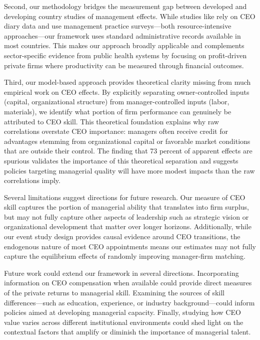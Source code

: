 \documentclass[11pt,a4paper]{article}
\begin{document}
Second, our methodology bridges the measurement gap between developed and developing country studies of management effects. While studies like \citet{bandiera2020ceo} rely on CEO diary data and \citet{bloom2013does} use management practice surveys---both resource-intensive approaches---our framework uses standard administrative records available in most countries. This makes our approach broadly applicable and complements sector-specific evidence from public health systems \citep{janke2024role, munoz2024leadership} by focusing on profit-driven private firms where productivity can be measured through financial outcomes.

Third, our model-based approach provides theoretical clarity missing from much empirical work on CEO effects. By explicitly separating owner-controlled inputs (capital, organizational structure) from manager-controlled inputs (labor, materials), we identify what portion of firm performance can genuinely be attributed to CEO skill. This theoretical foundation explains why raw correlations overstate CEO importance: managers often receive credit for advantages stemming from organizational capital or favorable market conditions that are outside their control. The finding that 73 percent of apparent effects are spurious validates the importance of this theoretical separation and suggests policies targeting managerial quality will have more modest impacts than the raw correlations imply.

Several limitations suggest directions for future research. Our measure of CEO skill captures the portion of managerial ability that translates into firm surplus, but may not fully capture other aspects of leadership such as strategic vision or organizational development that matter over longer horizons. Additionally, while our event study design provides causal evidence around CEO transitions, the endogenous nature of most CEO appointments means our estimates may not fully capture the equilibrium effects of randomly improving manager-firm matching.

Future work could extend our framework in several directions. Incorporating information on CEO compensation when available could provide direct measures of the private returns to managerial skill. Examining the sources of skill differences---such as education, experience, or industry background---could inform policies aimed at developing managerial capacity. Finally, studying how CEO value varies across different institutional environments could shed light on the contextual factors that amplify or diminish the importance of managerial talent.
\end{document}
